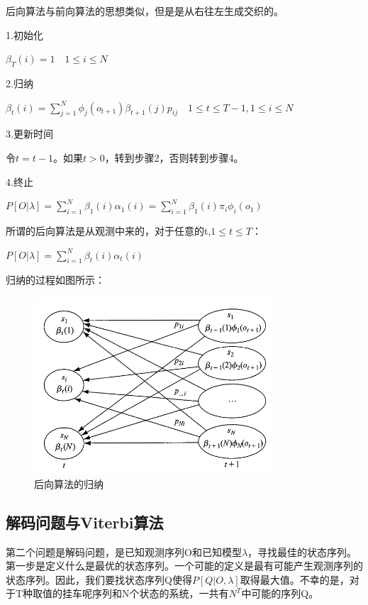 \documentclass[UTF8]{ctexart}
\begin{document}
后向算法与前向算法的思想类似，但是是从右往左生成交织的。

1.初始化

$\beta_T(i)=1\quad 1\le i \le N$

2.归纳

\begin{center}
$
\beta_t(i)=\sum_{j=1}^N\phi_j(o_{t+1})\beta_{t+1}(j)p_{ij}\quad 1\le t\le T-1,1\le i \le N
$
\end{center}

3.更新时间

令$t=t-1$。如果$t>0$，转到步骤2，否则转到步骤4。

4.终止

\begin{center}
$
P[O|\lambda]=\sum_{i=1}^N\beta_1(i)\alpha_1(i)=\sum_{i=1}^N\beta_1(i)\pi_i\phi_i(o_1)
$
\end{center}

所谓的后向算法是从观测中来的，对于任意的t,$1\le t\le T$：

\begin{center}
$
P[O|\lambda]=\sum_{i=1}^N\beta_t(i)\alpha_t(i)
$
\end{center}


归纳的过程如图所示：

\begin{figure}[htbp]
\centering\includegraphics[width=3.5in]{f117}
\caption{后向算法的归纳}\label{fig:3}
\end{figure}


\subsection{解码问题与Viterbi算法}

第二个问题是解码问题，是已知观测序列O和已知模型$\lambda$，寻找最佳的状态序列。第一步是定义什么是最优的状态序列。一个可能的定义是最有可能产生观测序列的状态序列。因此，我们要找状态序列Q使得$P[Q|O,\lambda]$取得最大值。不幸的是，对于T种取值的挂车呢序列和N个状态的系统，一共有$N^T$中可能的序列Q。
\end{document}
